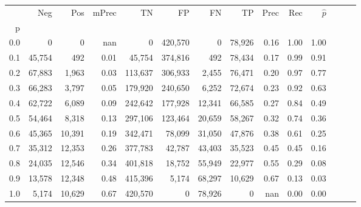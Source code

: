 \begin{tabular}{rrrrrrrrrrrrrr}
\toprule
{} &     Neg &     Pos & mPrec &       TN &       FP &      FN &      TP &  Prec &   Rec & $\hat{p}$ \\
p   &         &         &       &          &          &         &         &       &       &           \\
\midrule
0.0 &       0 &       0 &   nan &        0 &  420,570 &       0 &  78,926 &  0.16 &  1.00 &      1.00 \\
0.1 &  45,754 &     492 &  0.01 &   45,754 &  374,816 &     492 &  78,434 &  0.17 &  0.99 &      0.91 \\
0.2 &  67,883 &   1,963 &  0.03 &  113,637 &  306,933 &   2,455 &  76,471 &  0.20 &  0.97 &      0.77 \\
0.3 &  66,283 &   3,797 &  0.05 &  179,920 &  240,650 &   6,252 &  72,674 &  0.23 &  0.92 &      0.63 \\
0.4 &  62,722 &   6,089 &  0.09 &  242,642 &  177,928 &  12,341 &  66,585 &  0.27 &  0.84 &      0.49 \\
0.5 &  54,464 &   8,318 &  0.13 &  297,106 &  123,464 &  20,659 &  58,267 &  0.32 &  0.74 &      0.36 \\
0.6 &  45,365 &  10,391 &  0.19 &  342,471 &   78,099 &  31,050 &  47,876 &  0.38 &  0.61 &      0.25 \\
0.7 &  35,312 &  12,353 &  0.26 &  377,783 &   42,787 &  43,403 &  35,523 &  0.45 &  0.45 &      0.16 \\
0.8 &  24,035 &  12,546 &  0.34 &  401,818 &   18,752 &  55,949 &  22,977 &  0.55 &  0.29 &      0.08 \\
0.9 &  13,578 &  12,348 &  0.48 &  415,396 &    5,174 &  68,297 &  10,629 &  0.67 &  0.13 &      0.03 \\
1.0 &   5,174 &  10,629 &  0.67 &  420,570 &        0 &  78,926 &       0 &   nan &  0.00 &      0.00 \\
\bottomrule
\end{tabular}
